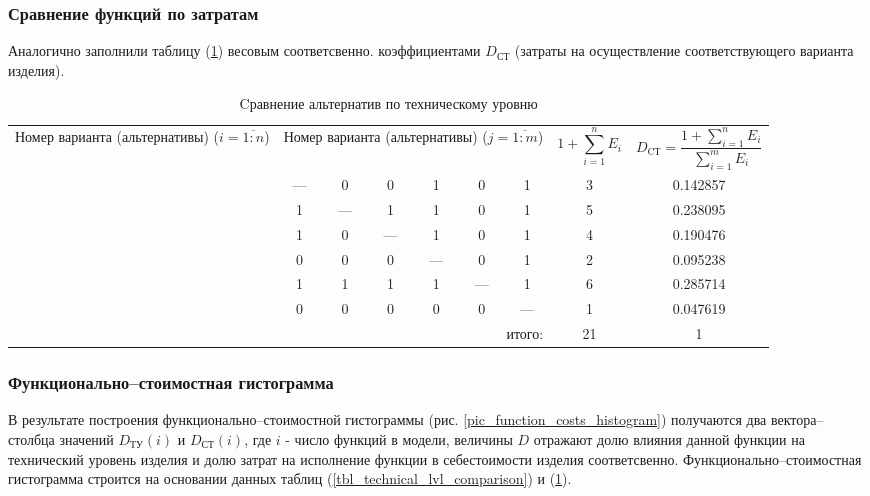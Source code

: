 \subsubsection{Сравнение функций по затратам}
Аналогично заполнили таблицу (\ref{tbl_costs_lvl_comparison}) весовым соответсвенно.
коэффициентами $D_\text{СТ}$ (затраты на осуществление соответствующего варианта
изделия).
\begin{table}[H]
    \centering
    \begin{tabular}{|c|c|c|c|c|c|c|c|c|}
        \hline
        \multirow{2}{2.4cm}{
            \centering
            Номер варианта (альтернативы) ($i = \overline{1:n}$)
        } &
        \multicolumn{6}{c|}{
            \parbox[t]{2.4cm}{
                \centering
                Номер варианта (альтернативы) ($j = \overline{1:m}$)
            }
        } &
        \multirow{2}{1.7cm}[0pt]{
            \centering
            $$1 + \sum_{i=1}^n E_i$$
        } &
        \multirow{2}{3.2cm}{
            \centering
            $$ D_\text{CТ} = \frac{1 + \sum_{i=1}^n E_i}{\sum_{i=1}^m E_i}$$
        } \\
        &
        \centering{1} &
        \centering{2} &
        \centering{3} &
        \centering{4} &
        \centering{5} &
        \centering{6} & & \\
        \hline \hline
        \centering{1} &---& 0 & 0 & 1 & 0 & 1 & 3 & 0.142857 \\ \hline
        \centering{2} & 1 &---& 1 & 1 & 0 & 1 & 5 & 0.238095 \\ \hline
        \centering{3} & 1 & 0 &---& 1 & 0 & 1 & 4 & 0.190476 \\ \hline
        \centering{4} & 0 & 0 & 0 &---& 0 & 1 & 2 & 0.095238 \\ \hline
        \centering{5} & 1 & 1 & 1 & 1 &---& 1 & 6 & 0.285714 \\ \hline
        \centering{6} & 0 & 0 & 0 & 0 & 0 &---& 1 & 0.047619 \\ \hline
        \hline
        \multicolumn{7}{|r|}{итого:} & 21 & 1 \\
        \hline
    \end{tabular}
    \caption{Cравнение альтернатив по техническому уровню}
    \label{tbl_costs_lvl_comparison}
\end{table}


\subsubsection{Функционально--стоимостная гистограмма}
В результате построения функционально--стоимостной гистограммы
(рис. \ref{pic_function_costs_histogram}) получаются два вектора--столбца
значений $D_\text{ТУ}(i)$ и $D_\text{СТ}(i)$, где $i$ - число функций в модели,
величины $D$ отражают долю влияния данной функции на технический уровень изделия
и долю затрат на исполнение функции в себестоимости изделия соответсвенно.
Функционально--стоимостная гистограмма строится на основании данных таблиц
(\ref{tbl_technical_lvl_comparison}) и (\ref{tbl_costs_lvl_comparison}).


